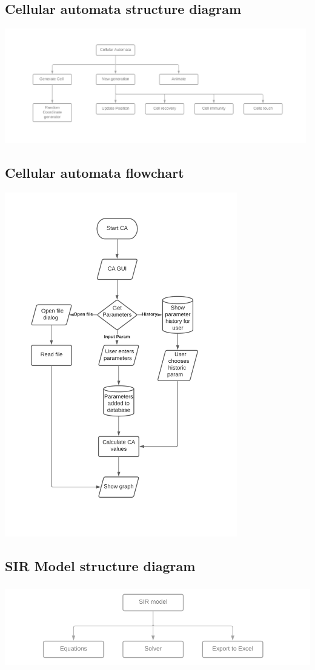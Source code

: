 \documentclass[11pt, a4paper]{article}
\begin{document}
\subsection{Cellular automata structure diagram}
\includegraphics[height=5cm]{s_CA.png}
\subsection{Cellular automata flowchart}
\includegraphics[height=15cm]{f_CA.png}
\newpage
\subsection{SIR Model structure diagram}
\includegraphics[height=3.6cm]{s_SIR.png}
\end{document}
